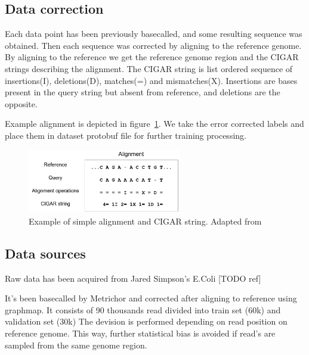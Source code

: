 \documentclass[times, utf8, diplomski, english]{fer}
\begin{document}
\subsection{Data correction}
Each data point has been previously basecalled, and some resulting sequence was obtained. Then each sequence was corrected by aligning to the reference genome. By aligning to the reference we get the reference genome region and the CIGAR strings describing the alignment. The CIGAR string is list ordered sequence of insertions(I), deletions(D), matches(=) and mismatches(X). Insertions are bases present in the query string but absent from reference, and deletions are the opposite. 

Example alignment is depicted in figure~\ref{fg:align}. We take the error corrected labels and place them in dataset protobuf file for further training processing.

\begin{figure}
    \begin{center}
        \includegraphics[width=0.6\textwidth]{alignment}
        \caption{Example of simple alignment and CIGAR string. Adapted from~\citep{mratkovic}}
        \label{fg:align}
    \end{center}
\end{figure} 

\subsection{Data sources}

Raw data has been acquired from Jared Simpson's E.Coli [TODO ref]

It's been basecalled by Metrichor and corrected after aligning to reference using graphmap. 
It consists of 90 thousands read divided into train set (60k) and validation set (30k)
The devision is performed depending on read position on reference genome. 
This way, further statistical bias is avoided if read's are sampled from the same genome region.

\end{document}
